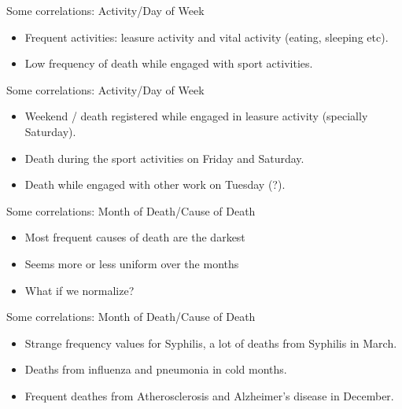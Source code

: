 \documentclass[xcolor=table]{beamer}
\begin{document}
     \begin{frame}{Some correlations: Activity/Day of Week}
     	\begin{itemize}
			\item Frequent activities: leasure activity and vital activity (eating, sleeping etc).
			\item Low frequency of death while engaged with sport activities.
		\end{itemize}
     	\begin{center}
		 \end{center}
     \end{frame}
     
     \begin{frame}{Some correlations: Activity/Day of Week}
     	\begin{itemize}
			\item Weekend / death registered while engaged in leasure activity (specially Saturday).
			\item Death during the sport activities on Friday and Saturday.
			\item Death while engaged with other work on Tuesday (?).
		\end{itemize}
     	\begin{center}
		 \end{center}
     \end{frame}
     
     
     \begin{frame}{Some correlations: Month of Death/Cause of Death}
     	\begin{itemize}
			\item Most frequent causes of death are the darkest
			\item Seems more or less uniform over the months
			\item What if we normalize?
		\end{itemize}
     	\begin{center}
		 \end{center}
     \end{frame}
     
     \begin{frame}{Some correlations: Month of Death/Cause of Death}
     	\begin{itemize}
			\item Strange frequency values for Syphilis, a lot of deaths from Syphilis in March.
			\item Deaths from influenza and pneumonia in cold months.
			\item Frequent deathes from Atherosclerosis and Alzheimer's disease in December.
		\end{itemize}
     	\begin{center}
		 \end{center}
     \end{frame}
\end{document}
